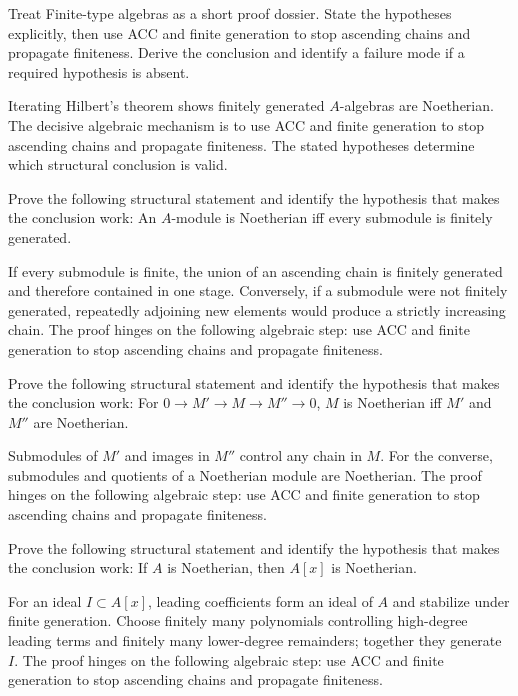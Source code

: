 \begin{problem}\label{prob:v15-problem-08}
Treat Finite-type algebras as a short proof dossier. State the hypotheses explicitly, then use ACC and finite generation to stop ascending chains and propagate finiteness. Derive the conclusion and identify a failure mode if a required hypothesis is absent.
\end{problem}
\begin{solution}
Iterating Hilbert's theorem shows finitely generated $A$-algebras are Noetherian. The decisive algebraic mechanism is to use ACC and finite generation to stop ascending chains and propagate finiteness. The stated hypotheses determine which structural conclusion is valid.
\end{solution}

\begin{problem}\label{prob:v15-problem-09}
Prove the following structural statement and identify the hypothesis that makes the conclusion work: An $A$-module is Noetherian iff every submodule is finitely generated.
\end{problem}
\begin{solution}
If every submodule is finite, the union of an ascending chain is finitely generated and therefore contained in one stage. Conversely, if a submodule were not finitely generated, repeatedly adjoining new elements would produce a strictly increasing chain. The proof hinges on the following algebraic step: use ACC and finite generation to stop ascending chains and propagate finiteness.
\end{solution}

\begin{problem}\label{prob:v15-problem-10}
Prove the following structural statement and identify the hypothesis that makes the conclusion work: For $0\to M'\to M\to M''\to0$, $M$ is Noetherian iff $M'$ and $M''$ are Noetherian.
\end{problem}
\begin{solution}
Submodules of $M'$ and images in $M''$ control any chain in $M$. For the converse, submodules and quotients of a Noetherian module are Noetherian. The proof hinges on the following algebraic step: use ACC and finite generation to stop ascending chains and propagate finiteness.
\end{solution}

\begin{problem}\label{prob:v15-problem-11}
Prove the following structural statement and identify the hypothesis that makes the conclusion work: If $A$ is Noetherian, then $A[x]$ is Noetherian.
\end{problem}
\begin{solution}
For an ideal $I\subset A[x]$, leading coefficients form an ideal of $A$ and stabilize under finite generation. Choose finitely many polynomials controlling high-degree leading terms and finitely many lower-degree remainders; together they generate $I$. The proof hinges on the following algebraic step: use ACC and finite generation to stop ascending chains and propagate finiteness.
\end{solution}


